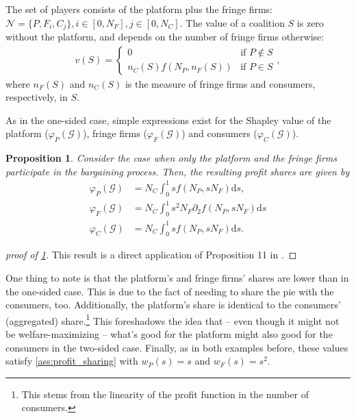 \documentclass[a4paper]{article}
\newtheorem{proposition}{Proposition}
\newcommand{\ds}{\mathrm{d}s}
\begin{document}
The set of players consists of the platform plus the fringe firms: $\mathcal{N} = \{P, F_i, C_j\}, i \in [0, N_F], j \in [0, N_C]$.
The value of a coalition $S$ is zero without the platform, and depends on the number of fringe firms otherwise:
\begin{align*}
    v(S) = \begin{cases}
        0 & \text{if } P \notin S \\
        n_C(S) f(N_P, n_F(S)) & \text{if } P \in S
    \end{cases},
\end{align*}
where $n_F(S)$ and $n_C(S)$ is the measure of fringe firms and consumers, respectively, in $S$.

As in the one-sided case, simple expressions exist for the Shapley value of the platform ($\varphi_P(\mathcal{G})$), fringe firms ($\varphi_F(\mathcal{G})$) and consumers ($\varphi_C(\mathcal{G})$).

\begin{proposition}
    \label{prop:profit_sharing_two_sided}
    Consider the case when only the platform and the fringe firms participate in the bargaining process.
    Then, the resulting profit shares are given by
    \begin{align*}
        \varphi_P(\mathcal{G}) &= N_C \int_0^1 s f(N_P, s N_F) \ds, \\
        \varphi_F(\mathcal{G}) &= N_C \int_0^1 s^2 N_F \partial_2 f(N_P, s N_F) \ds \\
        \varphi_C(\mathcal{G}) &= N_C \int_0^1 s f(N_P, s N_F) \ds.
    \end{align*}
\end{proposition}
\begin{proof}[proof of \cref{prop:profit_sharing_two_sided}]
    This result is a direct application of Proposition 11 in \textcite{stancsics2023value}.
\end{proof}

One thing to note is that the platform's and fringe firms' shares are lower than in the one-sided case.
This is due to the fact of needing to share the pie with the consumers, too.
Additionally, the platform's share is identical to the consumers' (aggregated) share.\footnote{
    This stems from the linearity of the profit function in the number of consumers.
}
This foreshadows the idea that -- even though it might not be welfare-maximizing -- what's good for the platform might also good for the consumers in the two-sided case.
Finally, as in both examples before, these values satisfy \cref{ass:profit_sharing} with $w_P(s) = s$ and $w_F(s) = s^2$.
\end{document}
